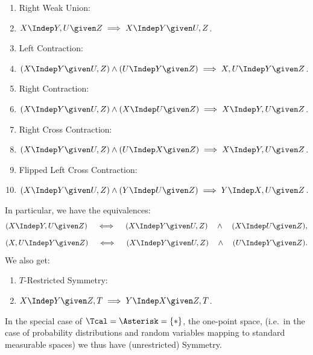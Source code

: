 \begin{DefThm}
\begin{enumerate}[label=\alph*)]
  \item Right Weak Union:\item[] $X \Indep  Y , U \given Z \implies X \Indep  Y \given U , Z$.
\item Left Contraction:\item[] 
 $ (X \Indep  Y \given U , Z) \land (U \Indep  Y \given Z) \implies X , U \Indep  Y \given Z$.
\item Right Contraction:
\item[] $ (X \Indep  Y \given U , Z) \land (X \Indep  U \given Z)  \implies X \Indep  Y , U \given Z$.
\item Right Cross Contraction:
\item[] $ (X \Indep  Y \given U , Z) \land (U \Indep  X \given Z) \implies X  \Indep  Y , U \given Z$.
\item Flipped Left Cross Contraction: 
\item[] $ (X \Indep  Y \given U , Z) \land (Y \Indep  U \given Z) \implies Y \Indep  X , U \given Z$.
\end{enumerate}
In particular, we have the equivalences:
$$ (X \Indep  Y , U \given Z) \quad\iff\quad (X \Indep  Y \given U , Z) \quad\land\quad (X \Indep  U \given Z)  ,$$
$$ (X , U \Indep  Y \given Z) \quad\iff\quad (X \Indep  Y \given U , Z) \quad\land\quad (U \Indep  Y \given Z).$$
We also get:
\begin{enumerate}[resume,label=\alph*)]
    \item $T$-Restricted Symmetry: %
	\item[] $X \Indep  Y \given Z,T \implies Y \Indep X \given Z,T$. 
\end{enumerate}
In the special case of $\Tcal = \Asterisk = \{\ast\}$, the one-point space, (i.e.\ in the case of probability distributions and random variables mapping to standard measurable spaces) we
thus have (unrestricted) Symmetry.
\end{DefThm}



